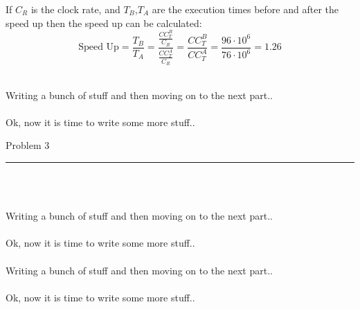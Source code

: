 \documentclass[11pt,reqno]{article}
\begin{document}
If $C_R$ is the clock rate, and $T_B$,$T_A$ are the execution times before and after the speed up then the speed up can be calculated:
\[ \text{Speed Up} =  \frac{T_B}{T_A} = \frac{\frac{CC_T^B}{C_R}}{\frac{CC_T^A}{C_R}} = \frac{CC_T^B}{CC_T^A} = \frac{96 \cdot 10^6}{76 \cdot 10^6} = 1.26\]

\noindent {}\\ 

Writing a bunch of stuff and then moving on to the next part..\\

\noindent {}\\ 

Ok, now it is time to write some more stuff.. \\


\begin{flushleft} 
Problem 3 \\
\rule{500pt}{1pt}\\
\end{flushleft} 
\\ 

Writing a bunch of stuff and then moving on to the next part..\\

\noindent{}\\ 

Ok, now it is time to write some more stuff.. \\

\noindent {}\\ 

Writing a bunch of stuff and then moving on to the next part..\\

\noindent {}\\ 

Ok, now it is time to write some more stuff.. \\
\end{document}

